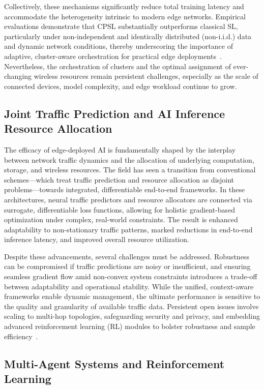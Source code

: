 \documentclass[sigconf]{acmart}
\begin{document}
Collectively, these mechanisms significantly reduce total training latency and accommodate the heterogeneity intrinsic to modern edge networks. Empirical evaluations demonstrate that CPSL substantially outperforms classical SL, particularly under non-independent and identically distributed (non-i.i.d.) data and dynamic network conditions, thereby underscoring the importance of adaptive, cluster-aware orchestration for practical edge deployments~\cite{ref47}. Nevertheless, the orchestration of clusters and the optimal assignment of ever-changing wireless resources remain persistent challenges, especially as the scale of connected devices, model complexity, and edge workload continue to grow.

\subsection{Joint Traffic Prediction and AI Inference Resource Allocation}

The efficacy of edge-deployed AI is fundamentally shaped by the interplay between network traffic dynamics and the allocation of underlying computation, storage, and wireless resources. The field has seen a transition from conventional schemes—which treat traffic prediction and resource allocation as disjoint problems—towards integrated, differentiable end-to-end frameworks. In these architectures, neural traffic predictors and resource allocators are connected via surrogate, differentiable loss functions, allowing for holistic gradient-based optimization under complex, real-world constraints. The result is enhanced adaptability to non-stationary traffic patterns, marked reductions in end-to-end inference latency, and improved overall resource utilization.

Despite these advancements, several challenges must be addressed. Robustness can be compromised if traffic predictions are noisy or insufficient, and ensuring seamless gradient flow amid non-convex system constraints introduces a trade-off between adaptability and operational stability. While the unified, context-aware frameworks enable dynamic management, the ultimate performance is sensitive to the quality and granularity of available traffic data. Persistent open issues involve scaling to multi-hop topologies, safeguarding security and privacy, and embedding advanced reinforcement learning (RL) modules to bolster robustness and sample efficiency~\cite{ref48}.

\subsection{Multi-Agent Systems and Reinforcement Learning}
\end{document}
